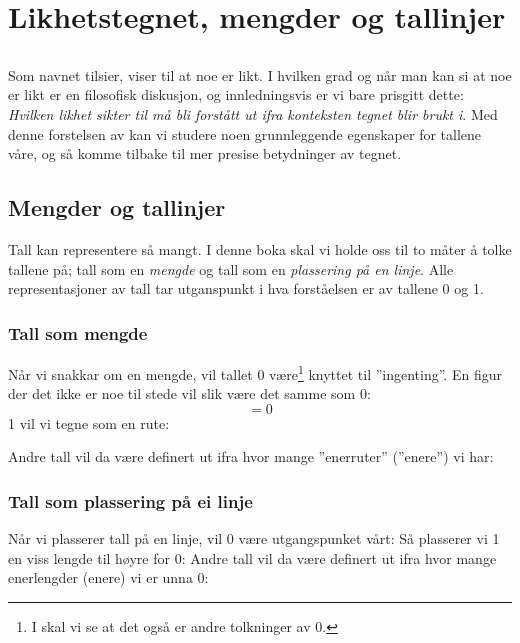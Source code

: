 




\newpage
\section{Likhetstegnet, mengder og tallinjer}
\subsection*{\likteikn}
Som navnet tilsier, viser   \sym{$ = $} til at noe er likt. I hvilken grad og når man kan si at noe er likt er en filosofisk diskusjon, og innledningsvis er vi bare prisgitt dette: \textsl{Hvilken likhet \sym{$=$} sikter til må bli forstått ut ifra konteksten tegnet blir brukt i}. Med denne forstelsen av \sym{$ = $} kan vi studere noen grunnleggende egenskaper for tallene våre, og så komme tilbake til mer presise betydninger av tegnet. \regv
{}
\subsection*{Mengder og tallinjer}
Tall kan representere så mangt. I denne boka skal vi holde oss til to måter å tolke tallene på; tall som en \textsl{mengde} og tall som en \textsl{plassering på en linje}. Alle representasjoner av tall tar utganspunkt i hva forståelsen er av tallene 0 og 1.

\subsubsection*{Tall som mengde}
	Når vi snakkar om en mengde, vil tallet 0 være\footnote{I  skal vi se at det også er andre tolkninger av 0.} knyttet til ''ingenting''. En figur der det ikke er noe til stede vil slik være det samme som 0:
	\[ =0 \]
	1 vil vi tegne som en rute:

Andre tall vil da være definert ut ifra hvor mange ''enerruter'' (''enere'') vi har:
\newpage	
\subsubsection*{Tall som plassering på ei linje}
	Når vi plasserer tall på en linje, vil 0 være utgangspunket vårt:
	Så plasserer vi 1 en viss lengde til høyre for 0:
	Andre tall vil da være definert ut ifra hvor mange enerlengder (enere) vi er unna 0:
